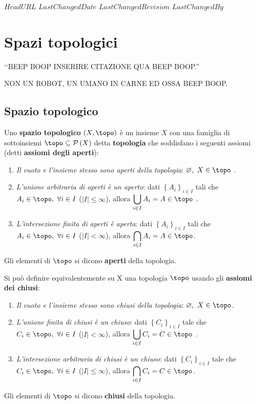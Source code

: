 \svnidlong
{$HeadURL$}
{$LastChangedDate$}
{$LastChangedRevision$}
{$LastChangedBy$}

\chapter{Spazi topologici}

\begin{introduction}
‘‘BEEP BOOP INSERIRE CITAZIONE QUA BEEP BOOP.''
\begin{flushright}
	\textsc{NON UN ROBOT,} UN UMANO IN CARNE ED OSSA BEEP BOOP.
\end{flushright}
\end{introduction}

	\section{Spazio topologico}
\begin{define}
	Uno \textbf{spazio topologico} $\left(X, \topo\right)$ è un insieme $X$ con una famiglia di sottoinsiemi $\topo\subseteq\setpart{X}$ detta \textbf{topologia} che soddisfano i seguenti assiomi (detti \textbf{assiomi degli aperti}):
	\begin{enumerate}
		\item \textit{Il vuoto e l'insieme stesso sono aperti della topologia}: $\emptyset,\ X\in\topo$ .
		\item \textit{L'unione arbitraria di aperti è un aperto}: dati $\left\{A_i\right\}_{i\in I}$ tali che $A_i\in\topo,\ \forall i\in I$ ($|I|\leq \infty$), allora $\displaystyle\union_{i\in I}A_i=A\in\topo$ .
		\item \textit{L'intersezione finita di aperti è aperta}: dati $\left\{A_i\right\}_{i\in I}$ tali che $A_i\in\topo,\ \forall i\in I$ ($|I|< \infty$), allora $\displaystyle\inter_{i\in I}A_i=A\in\topo$.
	\end{enumerate}
	Gli elementi di $\topo$ si dicono \textbf{aperti} della topologia.
\end{define}

\begin{define} Si può definire equivalentemente su X una topologia $\topo$ usando gli \textbf{assiomi dei chiusi}:
	\begin{enumerate}
		\item \textit{Il vuoto e l'insieme stesso sono chiusi della topologia}: $\emptyset,\ X\in\topo$.
		\item \textit{L'unione finita di chiusi è un chiuso}: dati $\left\{C_i\right\}_{i\in I}$ tale che $C_i\in\topo,\ \forall i\in I$ ($|I|< \infty$), allora $\displaystyle\union_{i\in I}C_i=C\in\topo$ .
		\item \textit{L'intersezione arbitraria di chiusi è un chiuso}: dati $\left\{C_i\right\}_{i\in I}$ tale che $C_i\in\topo,\ \forall i\in I$ ($|I|\leq \infty$), allora $\displaystyle\inter_{i\in I}C_i=C\in\topo$.
	\end{enumerate}
	Gli elementi di $\topo$ si dicono \textbf{chiusi} della topologia.
\end{define}

